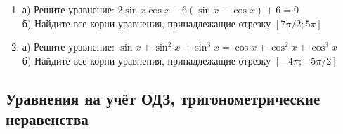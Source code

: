 \documentclass[12pt]{article}
\begin{document}
\begin{enumerate}[start=1,label={\itshape\bfseries \arabic*.}]
\item а) Решите уравнение: $2\sin{x}\cos{x} - 6(\sin{x} - \cos{x}) + 6 = 0$\\
      б) Найдите все корни уравнения, принадлежащие отрезку $[7\pi / 2; 5\pi]$

\item а) Решите уравнение: $\sin{x} + \sin^2{x} + \sin^3{x} = \cos{x} + \cos^2{x} + \cos^3{x}$\\
      б) Найдите все корни уравнения, принадлежащие отрезку $[-4\pi; -5\pi / 2]$
\end{enumerate}






\subsection{Уравнения на учёт ОДЗ, тригонометрические неравенства}
\end{document}

